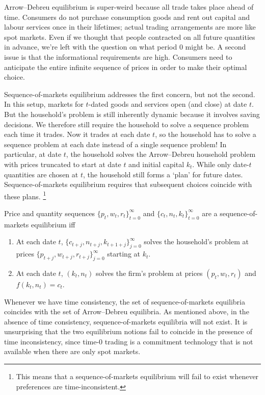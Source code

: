 \documentclass[11pt,letterpaper,reqno,oneside]{article}
\begin{document}
Arrow--Debreu equilibrium is super-weird because all trade takes place ahead of time. Consumers do not purchase consumption goods and rent out capital and labour services once in their lifetimes; actual trading arrangements are more like spot markets. Even if we thought that people contracted on all future quantities in advance, we're left with the question on what period 0 might be. A second issue is that the informational requirements are high. Consumers need to anticipate the entire infinite sequence of prices in order to make their optimal choice.

Sequence-of-markets equilibrium addresses the first concern, but not the second. In this setup, markets for $t$-dated goods and services open (and close) at date $t$. But the household's problem is still inherently dynamic because it involves saving decisions. We therefore still require the household to solve a sequence problem each time it trades. Now it trades at each date $t$, so the household has to solve a sequence problem at each date instead of a single sequence problem! In particular, at date $t$, the household solves the Arrow--Debreu household problem with prices truncated to start at date $t$ and initial capital $k_t$. While only date-$t$ quantities are chosen at $t$, the household still forms a `plan' for future dates. Sequence-of-markets equilibrium requires that subsequent choices coincide with these plans.%
	\footnote{This means that a sequence-of-markets equilibrium will fail to exist whenever preferences are time-inconsistent.}

\begin{definition}
	Price and quantity sequences $\{ p_t, w_t, r_t \}_{t=0}^\infty$ and $\{ c_t, n_t, k_t \}_{t=0}^\infty$ are a sequence-of-markets equilibrium iff
	\begin{enumerate}

		\item At each date $t$, $\{ c_{t+j}, n_{t+j}, k_{t+1+j} \}_{j=0}^\infty$ solves the household's problem at prices $\{ p_{t+j}, w_{t+j}, r_{t+j} \}_{j=0}^\infty$ starting at $k_t$.

		\item At each date $t$, $(k_t,n_t)$ solves the firm's problem at prices $(p_t, w_t, r_t )$ and $f(k_t,n_t) = c_t$.

	\end{enumerate}
\end{definition}

Whenever we have time consistency, the set of sequence-of-markets equilibria coincides with the set of Arrow--Debreu equilibria. As mentioned above, in the absence of time consistency, sequence-of-markets equilibria will not exist. It is unsurprising that the two equilibrium notions fail to coincide in the presence of time inconsistency, since time-0 trading is a commitment technology that is not available when there are only spot markets.
\end{document}
